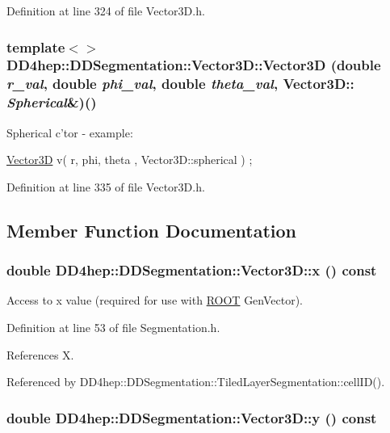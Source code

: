 Definition at line 324 of file Vector3D.h.\hypertarget{struct_d_d4hep_1_1_d_d_segmentation_1_1_vector3_d_ad09f6943130718a31edf854582980314}{
\subsubsection[{Vector3D}]{\setlength{\rightskip}{0pt plus 5cm}template$<$$>$ DD4hep::DDSegmentation::Vector3D::Vector3D (double {\em r\_\-val}, \/  double {\em phi\_\-val}, \/  double {\em theta\_\-val}, \/  Vector3D:: {\em Spherical}\&)()}}
\label{struct_d_d4hep_1_1_d_d_segmentation_1_1_vector3_d_ad09f6943130718a31edf854582980314}
Spherical c'tor -\/ example: \par
 \hyperlink{struct_d_d4hep_1_1_d_d_segmentation_1_1_vector3_d}{Vector3D} v( r, phi, theta , Vector3D::spherical ) ; 

Definition at line 335 of file Vector3D.h.

\subsection{Member Function Documentation}
\hypertarget{struct_d_d4hep_1_1_d_d_segmentation_1_1_vector3_d_a12a06ce31d8ebe61ef30183e16d88b6a}{
\subsubsection[{x}]{\setlength{\rightskip}{0pt plus 5cm}double DD4hep::DDSegmentation::Vector3D::x () const}}
\label{struct_d_d4hep_1_1_d_d_segmentation_1_1_vector3_d_a12a06ce31d8ebe61ef30183e16d88b6a}


Access to x value (required for use with \hyperlink{namespace_r_o_o_t}{ROOT} GenVector). 

Definition at line 53 of file Segmentation.h.

References X.

Referenced by DD4hep::DDSegmentation::TiledLayerSegmentation::cellID().\hypertarget{struct_d_d4hep_1_1_d_d_segmentation_1_1_vector3_d_a315b5dbb6abf747eac4a0432826b482f}{
\subsubsection[{y}]{\setlength{\rightskip}{0pt plus 5cm}double DD4hep::DDSegmentation::Vector3D::y () const}}
\label{struct_d_d4hep_1_1_d_d_segmentation_1_1_vector3_d_a315b5dbb6abf747eac4a0432826b482f}


